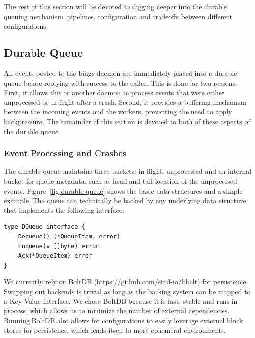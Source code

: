 \documentclass[10pt,twocolumn]{article}
\begin{document}
The rest of this section will be devoted to digging deeper into the durable
queuing mechanism, pipelines, configuration and tradeoffs between different
configurations.

\subsection{Durable Queue}

All events posted to the binge daemon are immediately placed into a durable
queue before replying with success to the caller.  This is done for two
reasons.  First, it allows this or another daemon to process events that were
either unprocessed or in-flight after a crash.  Second, it provides a buffering
mechanism between the incoming events and the workers, preventing the need to
apply backpressure.  The remainder of this section is devoted to both of these
aspects of the durable queue.

\subsubsection{Event Processing and Crashes}

The durable queue maintains three buckets: in-flight, unprocessed and an
internal bucket for queue metadata, such as head and tail location of the
unprocessed events.  Figure~\ref{fig:durable-queue} shows the basic data
structures and a simple example.  The queue can technically be backed by any
underlying data structure that implements the following interface:

\begin{lstlisting}[linewidth=\columnwidth,breaklines=true]
type DQueue interface {
    Dequeue() (*QueueItem, error)
    Enqueue(v []byte) error
    Ack(*QueueItem) error
}
\end{lstlisting}

We currently rely on BoltDB (https://github.com/etcd-io/bbolt) for persistence.
Swapping out backends is trivial as long as the backing system can be mapped to
a Key-Value interface.  We chose BoltDB because it is fast, stable and runs
in-process, which allows us to minimize the number of external dependencies.
Running BoltDB also allows for configurations to easily leverage external block
stores for persistence, which lends itself to more ephemeral environments.
\end{document}
